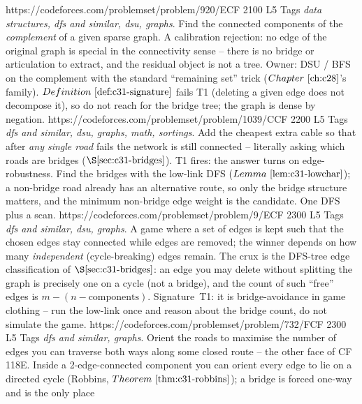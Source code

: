 \begin{mixedset}
    {https://codeforces.com/problemset/problem/920/E}{CF 2100 L5}
    {Tags \emph{data structures, dfs and similar, dsu, graphs}. Find the connected components
     of the \emph{complement} of a given sparse graph.  A calibration rejection: no edge of
     the original graph is special in the connectivity sense -- there is no bridge or
     articulation to extract, and the residual object is not a tree.  Owner: DSU / BFS on
     the complement with the standard ``remaining set'' trick (\(\chref{c28}\)'s family).
     \(\defref{c31-signature}\) fails T1 (deleting a given edge does not decompose it), so
     do not reach for the bridge tree; the graph is dense by negation.}
    {https://codeforces.com/problemset/problem/1039/C}{CF 2200 L5}
    {Tags \emph{dfs and similar, dsu, graphs, math, sortings}. Add the cheapest extra cable so
     that after \emph{any single road} fails the network is still connected -- literally
     asking which roads are bridges (\(\secref{c31-bridges}\)).  T1 fires: the answer turns
     on edge-robustness.  Find the bridges with the low-link DFS (\(\lemref{c31-lowchar}\));
     a non-bridge road already has an alternative route, so only the bridge structure
     matters, and the minimum non-bridge edge weight is the candidate.  One DFS plus a scan.}
    {https://codeforces.com/problemset/problem/9/E}{CF 2300 L5}
    {Tags \emph{dfs and similar, dsu, graphs}. A game where a set of edges is kept such that
     the chosen edges stay connected while edges are removed; the winner depends on how many
     \emph{independent} (cycle-breaking) edges remain.  The crux is the DFS-tree edge
     classification of \(\secref{c31-bridges}\): an edge you may delete without splitting
     the graph is precisely one on a cycle (not a bridge), and the count of such ``free''
     edges is \(m-(n-\text{components})\).  Signature~T1: it is bridge-avoidance in game
     clothing -- run the low-link once and reason about the bridge count, do not simulate
     the game.}
    {https://codeforces.com/problemset/problem/732/F}{CF 2300 L5}
    {Tags \emph{dfs and similar, graphs}. Orient the roads to maximise the number of edges
     you can traverse both ways along some closed route -- the other face of CF 118E.  Inside
     a 2-edge-connected component you can orient every edge to lie on a directed cycle
     (Robbins, \(\thmref{c31-robbins}\)); a bridge is forced one-way and is the only place
}
\end{mixedset}
